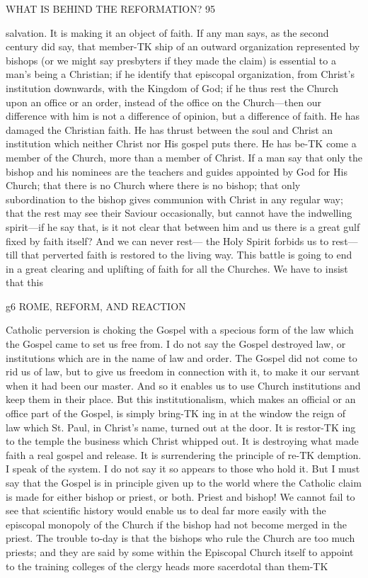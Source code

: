 \documentclass[12pt,a5paper,oneside]{book}
\begin{document}
WHAT IS BEHIND THE REFORMATION? 95 

salvation. It is making it an object of faith. If any 
man says, as the second century did say, that member-TK
ship of an outward organization represented by bishops 
(or we might say presbyters if they made the claim) is 
essential to a man's being a Christian; if he identify 
that episcopal organization, from Christ's institution 
downwards, with the Kingdom of God; if he thus 
rest the Church upon an office or an order, instead of 
the office on the Church---then our difference with 
him is not a difference of opinion, but a difference of 
faith. He has damaged the Christian faith. He has 
thrust between the soul and Christ an institution which 
neither Christ nor His gospel puts there. He has be-TK
come a member of the Church, more than a member 
of Christ. If a man say that only the bishop and his 
nominees are the teachers and guides appointed by 
God for His Church; that there is no Church where 
there is no bishop; that only subordination to the 
bishop gives communion with Christ in any regular 
way; that the rest may see their Saviour occasionally, 
but cannot have the indwelling spirit---if he say that, 
is it not clear that between him and us there is a great 
gulf fixed by faith itself? And we can never rest---
the Holy Spirit forbids us to rest---till that perverted 
faith is restored to the living way. This battle is 
going to end in a great clearing and uplifting of faith 
for all the Churches. We have to insist that this 



g6 ROME, REFORM, AND REACTION 

Catholic perversion is choking the Gospel with a 
specious form of the law which the Gospel came to 
set us free from. I do not say the Gospel destroyed 
law, or institutions which are in the name of law and 
order. The Gospel did not come to rid us of law, but 
to give us freedom in connection with it, to make it 
our servant when it had been our master. And so it 
enables us to use Church institutions and keep them in 
their place. But this institutionalism, which makes an 
official or an office part of the Gospel, is simply bring-TK
ing in at the window the reign of law which St. Paul, 
in Christ's name, turned out at the door. It is restor-TK
ing to the temple the business which Christ whipped 
out. It is destroying what made faith a real gospel 
and release. It is surrendering the principle of re-TK
demption. I speak of the system. I do not say it so 
appears to those who hold it. But I must say that 
the Gospel is in principle given up to the world where 
the Catholic claim is made for either bishop or priest, 
or both. Priest and bishop! We cannot fail to see 
that scientific history would enable us to deal far more 
easily with the episcopal monopoly of the Church if 
the bishop had not become merged in the priest. The 
trouble to-day is that the bishops who rule the Church 
are too much priests; and they are said by some within 
the Episcopal Church itself to appoint to the training 
colleges of the clergy heads more sacerdotal than them-TK
\end{document}
